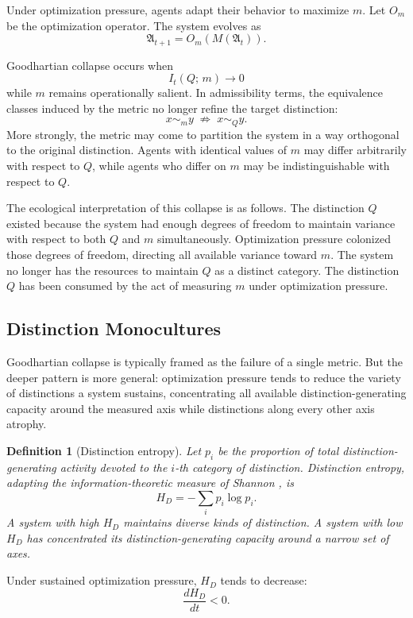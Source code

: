 \documentclass[12pt, a4paper]{article}
\theoremstyle{flyxion}
\newtheorem{definition}{Definition}
\newcommand{\fA}{\mathfrak{A}}
\begin{document}
Under optimization pressure, agents adapt their behavior to maximize $m$. Let $O_m$ be the optimization operator. The system evolves as
\[
  \fA_{t+1} = O_m(M(\fA_t)).
\]

Goodhartian collapse occurs when
\[
  I_t(Q;\, m) \to 0
\]
while $m$ remains operationally salient. In admissibility terms, the equivalence classes induced by the metric no longer refine the target distinction:
\[
  x \sim_m y \;\not\Rightarrow\; x \sim_Q y.
\]
More strongly, the metric may come to partition the system in a way orthogonal to the original distinction. Agents with identical values of $m$ may differ arbitrarily with respect to $Q$, while agents who differ on $m$ may be indistinguishable with respect to $Q$.

The ecological interpretation of this collapse is as follows. The distinction $Q$ existed because the system had enough degrees of freedom to maintain variance with respect to both $Q$ and $m$ simultaneously. Optimization pressure colonized those degrees of freedom, directing all available variance toward $m$. The system no longer has the resources to maintain $Q$ as a distinct category. The distinction $Q$ has been consumed by the act of measuring $m$ under optimization pressure.

\subsection*{Distinction Monocultures}

Goodhartian collapse is typically framed as the failure of a single metric. But the deeper pattern is more general: optimization pressure tends to reduce the variety of distinctions a system sustains, concentrating all available distinction-generating capacity around the measured axis while distinctions along every other axis atrophy.

\begin{definition}[Distinction entropy]
Let $p_i$ be the proportion of total distinction-generating activity devoted to the $i$-th category of distinction. Distinction entropy, adapting the information-theoretic measure of Shannon \cite{shannon1948}, is
\[
  H_D = -\sum_i p_i \log p_i.
\]
A system with high $H_D$ maintains diverse kinds of distinction. A system with low $H_D$ has concentrated its distinction-generating capacity around a narrow set of axes.
\end{definition}

Under sustained optimization pressure, $H_D$ tends to decrease:
\[
  \frac{dH_D}{dt} < 0.
\]
\end{document}
